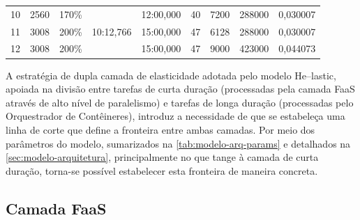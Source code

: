 \documentclass[english,brazilian]{UNISINOSmonografia} %
\newcommand\defaultFigureWidth{0.9}
\begin{document}
\begin{table}[tb]
\begin{minipage}{\defaultFigureWidth\textwidth}
\begin{tabularx}{\textwidth}{rrrrrWWrr}
			10 & 2560 & 170\% &  & 12:00,000 & 40 & 7200 & 288000 & 0,030007 \\
			11 & 3008 & 200\% & 10:12,766 & 15:00,000 & 47 & 6128 & 288000 & 0,030007 \\
			12 & 3008 & 200\% &  & 15:00,000 & 47 & 9000 & 423000 & 0,044073 \\ 
			\bottomrule
		\end{tabularx}
	\end{minipage}
\end{table}



A estratégia de dupla camada de elasticidade adotada pelo modelo \textsf{He}--lastic, apoiada na divisão entre tarefas de curta duração (processadas pela camada FaaS através de alto nível de paralelismo) e tarefas de longa duração (processadas pelo Orquestrador de Contêineres), introduz a necessidade de que se estabeleça uma linha de corte que define a fronteira entre ambas camadas.
Por meio dos parâmetros do modelo, sumarizados na \autoref{tab:modelo-arq-params} e detalhados na \autoref{sec:modelo-arquitetura}, principalmente no que tange à camada de curta duração, torna-se possível estabelecer esta fronteira de maneira concreta.





\subsection{Camada FaaS}
\label{sec:modelo-custben-faas}
\end{document}
